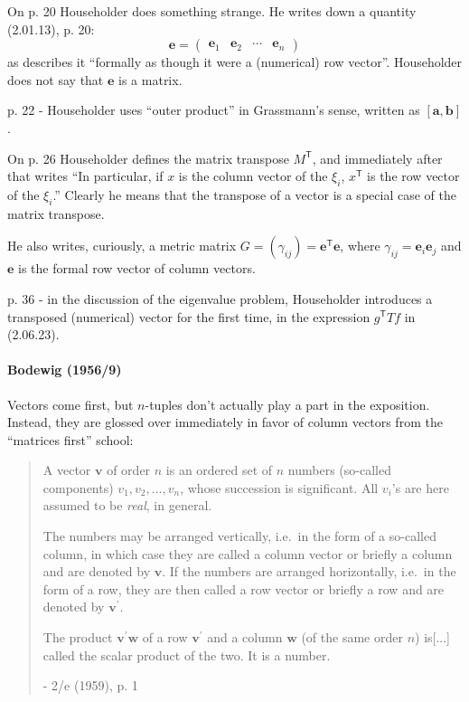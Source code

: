 On p. 20 Householder does something strange. He writes down a quantity (2.01.13), p. 20:
\[
\mathbf e = \begin{pmatrix}\mathbf e_1 & \mathbf e_2 & \cdots & \mathbf e_n\end{pmatrix}
\]
as describes it ``formally as though it were a (numerical) row vector''.
Householder does not say that $\mathbf e$ is a matrix.

p. 22 - Householder uses ``outer product'' in Grassmann's sense, written as
$[\mathbf a, \mathbf b]$.

On p. 26 Householder defines the matrix transpose $M^{\mathsf T}$, and immediately
after that writes ``In particular, if $x$ is the column vector of the $\xi_i$,
$x^{\mathsf T}$ is the row vector of the $\xi_i$.'' Clearly he means that the
transpose of a vector is a special case of the matrix transpose.

He also writes, curiously, a metric matrix $G = (\gamma_{ij}) = \mathbf e^{\mathsf T} \mathbf e$,
where $\gamma_{ij} = \mathbf e_i \mathbf e_j$ and $\mathbf e$ is the formal row
vector of column vectors.

p. 36 - in the discussion of the eigenvalue problem, Householder introduces a
transposed (numerical) vector for the first time, in the expression $g^{\mathsf
T}Tf$ in (2.06.23).



\paragraph{Bodewig (1956/9)~\cite{Bodewig1956}}

Vectors come first, but $n$-tuples don't actually play a part in the exposition.
Instead, they are glossed over immediately in favor of column vectors from the
``matrices first'' school:

\begin{quote}
A vector $\mathbf v$ of order $n$ is an ordered set of $n$ numbers (so-called
components) $v_1, v_2, \dots, v_n$, whose succession is significant. All $v_i$'s are here
assumed to be \textit{real}, in general.

The numbers may be arranged vertically, i.e.\ in the form of a so-called
column, in which case they are called a column vector or briefly a
column and are denoted by $\mathbf v$. If the numbers are arranged horizontally,
i.e.\ in the form of a row, they are then called a row vector or briefly a
row and are denoted by $\mathbf v^\prime$.

The product $\mathbf v^\prime \mathbf w$ of a row $\mathbf v^\prime$ and a column
$\mathbf w$ (of the same order $n$) is[...] called the scalar product of the two. It is a number.

- 2/e (1959), p. 1
\end{quote}

